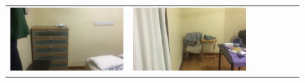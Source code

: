 \documentclass[letterpaper, 10 pt, conference]{ieeeconf}  %
\begin{document}
\begin{figure}
\begin{tabular*}{\textwidth}{ccccccc}
 \includegraphics[width=\imgW,height=\imgH]{rio-q6} &
 \includegraphics[width=\imgW,height=\imgH]{rio-q8} \\


\end{tabular*}
\end{figure}
\end{document}
